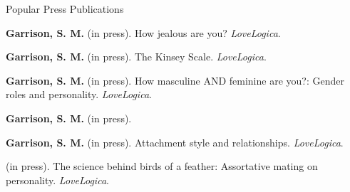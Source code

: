 \begin{rSection}{\textrm{Popular Press Publications}} \begin{etaremune}
\item\textbf{Garrison, S. M.} (in press). How jealous are you? \textit{LoveLogica}.
\item\textbf{Garrison, S. M.} (in press). The Kinsey Scale. \textit{LoveLogica}.%
\item\textbf{Garrison, S. M.} (in press). How masculine AND feminine are you?: Gender roles and personality. \textit{LoveLogica}.
\item\textbf{Garrison, S. M.} (in press). %
\item\textbf{Garrison, S. M.} (in press). Attachment style and relationships. \textit{LoveLogica}.
\item\meb(in press). The science behind birds of a feather: Assortative mating on personality. \textit{LoveLogica}.
\end{etaremune}\end{rSection}